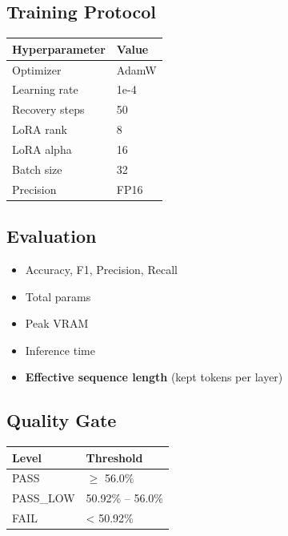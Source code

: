 \subsection{Training Protocol}

\begin{table}[H]
\centering
\small
\begin{tabular}{ll}
\toprule
\textbf{Hyperparameter} & \textbf{Value} \\
\midrule
Optimizer & AdamW \\
Learning rate & 1e-4 \\
Recovery steps & 50 \\
LoRA rank & 8 \\
LoRA alpha & 16 \\
Batch size & 32 \\
Precision & FP16 \\
\bottomrule
\end{tabular}
\end{table}

\subsection{Evaluation}

\begin{itemize}
\item Accuracy, F1, Precision, Recall
\item Total params
\item Peak VRAM
\item Inference time
\item \textbf{Effective sequence length} (kept tokens per layer)

\end{itemize}
\subsection{Quality Gate}

\begin{table}[H]
\centering
\small
\begin{tabular}{ll}
\toprule
\textbf{Level} & \textbf{Threshold} \\
\midrule
PASS & $\ge$ 56.0\% \\
PASS\_LOW & 50.92\% -- 56.0\% \\
FAIL & \textless{} 50.92\% \\
\bottomrule
\end{tabular}
\end{table}

